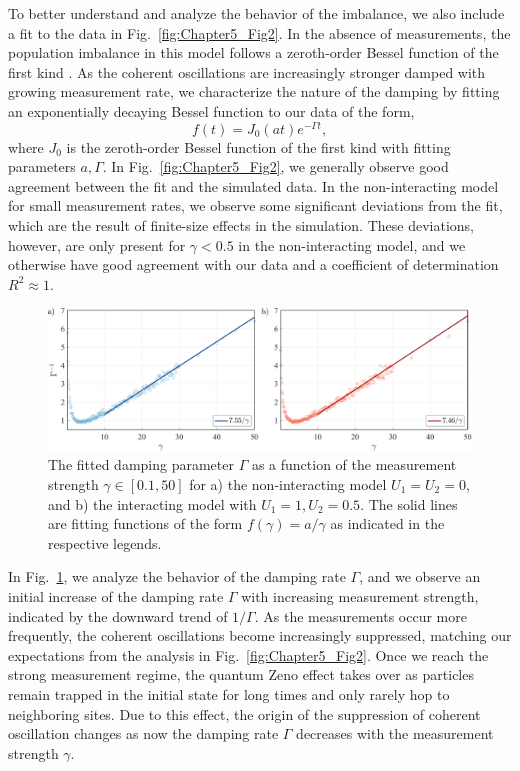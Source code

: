 To better understand and analyze the behavior of the imbalance, we also include a fit to the data in Fig.~\ref{fig:Chapter5_Fig2}. In the absence of measurements, the population imbalance in this model follows a zeroth-order Bessel function of the first kind \cite{barmettler2009}. As the coherent oscillations are increasingly stronger damped with growing measurement rate, we characterize the nature of the damping by fitting an exponentially decaying Bessel function to our data of the form, 
\begin{equation}
    f(t) = J_0(at) e^{-\Gamma t},
\end{equation}
where $J_0$ is the zeroth-order Bessel function of the first kind with fitting parameters $a, \Gamma$. In Fig.~\ref{fig:Chapter5_Fig2}, we generally observe good agreement between the fit and the simulated data. In the non-interacting model for small measurement rates, we observe some significant deviations from the fit, which are the result of finite-size effects in the simulation. These deviations, however, are only present for $\gamma < 0.5$ in the non-interacting model, and we otherwise have good agreement with our data and a coefficient of determination $R^2 \approx 1$. 

\begin{figure}[ht]
    \centering
    \includegraphics[width=\textwidth]{Chapters/Plots/Chapter6/Chapter5_Fig3.pdf}
    \caption{The fitted damping parameter $\Gamma$ as a function of the measurement strength $\gamma \in [0.1,50]$ for a) the non-interacting model $U_1 = U_2 = 0$, and b) the interacting model with $U_1 = 1, U_2 = 0.5$. The solid lines are fitting functions of the form $f(\gamma) = a/\gamma$ as indicated in the respective legends.}
    \label{fig:Chapter5_Fig3}
\end{figure}

In Fig.~\ref{fig:Chapter5_Fig3}, we analyze the behavior of the damping rate $\Gamma$, and we observe an initial increase of the damping rate $\Gamma$ with increasing measurement strength, indicated by the downward trend of $1/\Gamma$. As the measurements occur more frequently, the coherent oscillations become increasingly suppressed, matching our expectations from the analysis in Fig.~\ref{fig:Chapter5_Fig2}. Once we reach the strong measurement regime, the quantum Zeno effect takes over as particles remain trapped in the initial state for long times and only rarely hop to neighboring sites. Due to this effect, the origin of the suppression of coherent oscillation changes as now the damping rate $\Gamma$ decreases with the measurement strength $\gamma$. 

